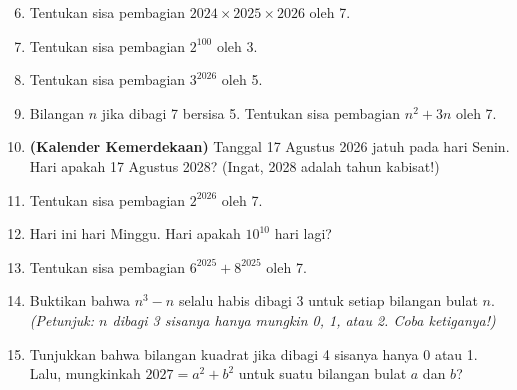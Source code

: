 \documentclass[11pt,a4paper]{article}
\begin{document}
\begin{enumerate}
    \setcounter{enumi}{5}
    \item Tentukan sisa pembagian $2024 \times 2025 \times 2026$ oleh 7.
    \item Tentukan sisa pembagian $2^{100}$ oleh 3.
    \item Tentukan sisa pembagian $3^{2026}$ oleh 5.
    \item Bilangan $n$ jika dibagi 7 bersisa 5. Tentukan sisa pembagian $n^2 + 3n$ oleh 7.
    \item \textbf{(Kalender Kemerdekaan)} Tanggal 17 Agustus 2026 jatuh pada hari Senin.
          Hari apakah 17 Agustus 2028? (Ingat, 2028 adalah tahun kabisat!)
\end{enumerate}

\begin{enumerate}
    \setcounter{enumi}{10}
    \item Tentukan sisa pembagian $2^{2026}$ oleh 7.
    \item Hari ini hari Minggu. Hari apakah $10^{10}$ hari lagi?
    \item Tentukan sisa pembagian $6^{2025} + 8^{2025}$ oleh 7.
    \item Buktikan bahwa $n^3 - n$ selalu habis dibagi 3 untuk setiap bilangan bulat $n$.
          \textit{(Petunjuk: $n$ dibagi 3 sisanya hanya mungkin 0, 1, atau 2. Coba ketiganya!)}
    \item Tunjukkan bahwa bilangan kuadrat jika dibagi 4 sisanya hanya 0 atau 1. Lalu, mungkinkah
          $2027 = a^2 + b^2$ untuk suatu bilangan bulat $a$ dan $b$?
\end{enumerate}
\end{document}
